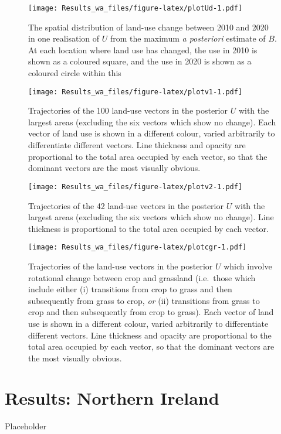 \documentclass[
]{book}
\begin{document}
\begin{figure}
\centering
\texttt{[image: Results\_wa\_files/figure-latex/plotUd-1.pdf]}
\caption{\label{fig:plotUd}The spatial distribution of land-use change between 2010 and 2020 in one realisation of \(U\) from the maximum \emph{a posteriori} estimate of \(B\). At each location where land use has changed, the use in 2010 is shown as a coloured square, and the use in 2020 is shown as a coloured circle within this}
\end{figure}

\begin{figure}
\centering
\texttt{[image: Results\_wa\_files/figure-latex/plotv1-1.pdf]}
\caption{\label{fig:plotv1}Trajectories of the 100 land-use vectors in the posterior \(U\) with the largest areas (excluding the six vectors which show no change). Each vector of land use is shown in a different colour, varied arbitrarily to differentiate different vectors. Line thickness and opacity are proportional to the total area occupied by each vector, so that the dominant vectors are the most visually obvious.}
\end{figure}

\begin{figure}
\centering
\texttt{[image: Results\_wa\_files/figure-latex/plotv2-1.pdf]}
\caption{\label{fig:plotv2}Trajectories of the 42 land-use vectors in the posterior \(U\) with the largest areas (excluding the six vectors which show no change). Line thickness is proportional to the total area occupied by each vector.}
\end{figure}

\begin{figure}
\centering
\texttt{[image: Results\_wa\_files/figure-latex/plotcgr-1.pdf]}
\caption{\label{fig:plotcgr}Trajectories of the land-use vectors in the posterior \(U\) which involve rotational change between crop and grassland (i.e.~those which include either (i) transitions from crop to grass and then subsequently from grass to crop, \emph{or} (ii) transitions from grass to crop and then subsequently from crop to grass). Each vector of land use is shown in a different colour, varied arbitrarily to differentiate different vectors. Line thickness and opacity are proportional to the total area occupied by each vector, so that the dominant vectors are the most visually obvious.}
\end{figure}

\hypertarget{results-northern-ireland}{%
\chapter{Results: Northern Ireland}\label{results-northern-ireland}}

Placeholder
\end{document}
